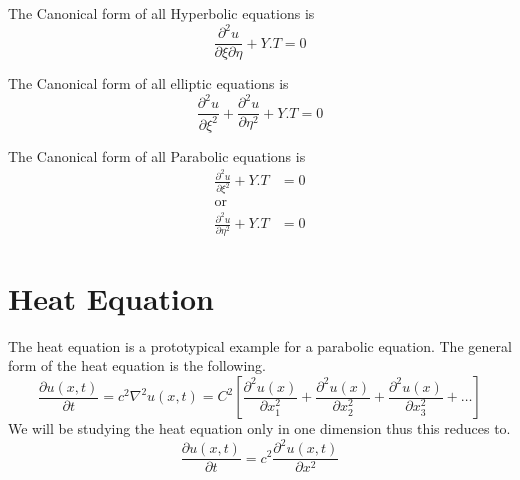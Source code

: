 \documentclass[]{article}
\begin{document}
\begin{observation}
    The Canonical form of all Hyperbolic equations is 
    \[
        \frac{\partial^2 u}{\partial\xi\partial\eta} +Y.T = 0
    \]
\end{observation}
\begin{observation}
    The Canonical form of all elliptic equations is 
    \[
        \frac{\partial^2 u}{\partial\xi^2}+\frac{\partial^2 u}{\partial\eta^2}+Y.T =0
    \]
\end{observation}
\begin{observation}
    The Canonical form of all Parabolic equations is 
    \begin{align*}
        \frac{\partial^2 u}{\partial\xi^2}+Y.T &=0
        \\
        \text{or}
        \\
        \frac{\partial^2 u}{\partial\eta^2}+Y.T &=0
    \end{align*}
\end{observation}

\newpage
\section{Heat Equation}
The heat equation is a prototypical example for a parabolic equation. The general form of the heat equation is the following.
\[
    \frac{\partial u(x,t)}{\partial t} = c^2\nabla^2 u(x,t) = C^2\left[\frac{\partial^2 u(x)}{\partial x^{2}_{1}} + \frac{\partial^2 u(x)}{\partial x^{2}_{2}} + \frac{\partial^2 u(x)}{\partial x^{2}_{3}} + \dots\right]    
\]
We will be studying the heat equation only in one dimension thus this reduces to.
\[
    \frac{\partial u(x,t)}{\partial t} = c^2 \frac{\partial^2 u(x,t)}{\partial x^2}     
\]
\end{document}
